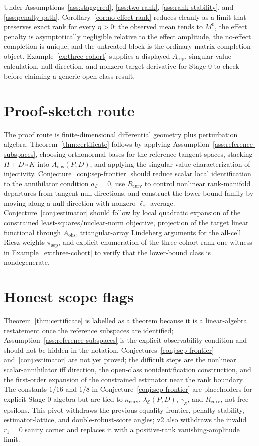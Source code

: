 \documentclass[11pt]{article}
\theoremstyle{definition}
\theoremstyle{plain}
\theoremstyle{remark}
\begin{document}
Under Assumptions~\ref{ass:staggered}, \ref{ass:two-rank}, \ref{ass:rank-stability}, and \ref{ass:penalty-path}, Corollary~\ref{cor:no-effect-rank} reduces cleanly as a limit that preserves exact rank for every \(\eta>0\): the observed mean tends to \(M^0\), the effect penalty is asymptotically negligible relative to the effect amplitude, the no-effect completion is unique, and the untreated block is the ordinary matrix-completion object.  Example~\ref{ex:three-cohort} supplies a displayed \(A_{\mathrm{sep}}\), singular-value calculation, null direction, and nonzero target derivative for Stage 0 to check before claiming a generic open-class result.

\section{Proof-sketch route}
The proof route is finite-dimensional differential geometry plus perturbation algebra.  Theorem~\ref{thm:certificate} follows by applying Assumption~\ref{ass:reference-subspaces}, choosing orthonormal bases for the reference tangent spaces, stacking \(H+D\circ K\) into \(A_{\mathrm{obs}}(P,D)\), and applying the singular-value characterization of injectivity.  Conjecture~\ref{conj:sep-frontier} should reduce scalar local identification to the annihilator condition \(a_{\mathcal E}=0\), use \(R_{\mathrm{curv}}\) to control nonlinear rank-manifold departures from tangent null directions, and construct the lower-bound family by moving along a null direction with nonzero \(\ell_{\mathcal E}\) average.  Conjecture~\ref{conj:estimator} should follow by local quadratic expansion of the constrained least-squares/nuclear-norm objective, projection of the target linear functional through \(A_{\mathrm{obs}}\), triangular-array Lindeberg arguments for the all-cell Riesz weights \(\pi_{\mathrm{sep}}\), and explicit enumeration of the three-cohort rank-one witness in Example~\ref{ex:three-cohort} to verify that the lower-bound class is nondegenerate.

\section{Honest scope flags}
Theorem~\ref{thm:certificate} is labelled as a theorem because it is a linear-algebra restatement once the reference subspaces are identified; Assumption~\ref{ass:reference-subspaces} is the explicit observability condition and should not be hidden in the notation.  Conjectures~\ref{conj:sep-frontier} and~\ref{conj:estimator} are not yet proved; the difficult steps are the nonlinear scalar-annihilator iff direction, the open-class nonidentification construction, and the first-order expansion of the constrained estimator near the rank boundary.  The constants \(1/16\) and \(1/8\) in Conjecture~\ref{conj:sep-frontier} are placeholders for explicit Stage 0 algebra but are tied to \(\kappa_{\mathrm{curv}}\), \(\lambda_{\mathcal E}(P,D)\), \(\gamma_{\mathcal E}\), and \(R_{\mathrm{curv}}\), not free epsilons.  This pivot withdraws the previous equality-frontier, penalty-stability, estimator-lattice, and double-robust-score angles; v2 also withdraws the invalid \(r_1=0\) sanity corner and replaces it with a positive-rank vanishing-amplitude limit.
\end{document}
